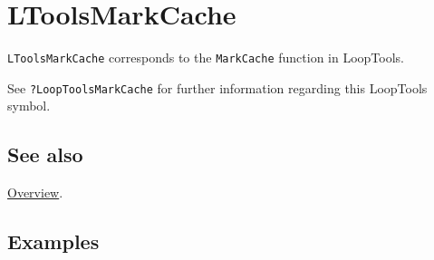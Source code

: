 \documentclass[../FeynHelpersManual.tex]{subfiles}
\begin{document}
\hypertarget{ltoolsmarkcache}{
\section{LToolsMarkCache}\label{ltoolsmarkcache}}

\texttt{LToolsMarkCache} corresponds to the \texttt{MarkCache} function
in LoopTools.

See \texttt{?LoopTools\textasciigrave MarkCache} for further information
regarding this LoopTools symbol.

\subsection{See also}

\hyperlink{toc}{Overview}.

\subsection{Examples}
\end{document}
